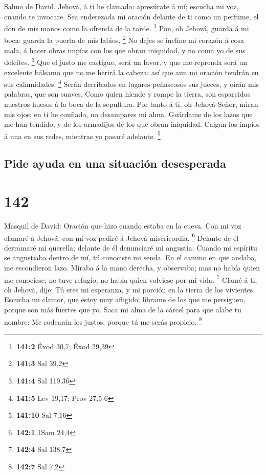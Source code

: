  Salmo de David. Jehová, á ti he clamado: apresúrate á mí;
escucha mi voz, cuando te invocare.  Sea enderezada mi
oración delante de ti como un perfume, el don de mis manos como la
ofrenda de la tarde. \footnote{\textbf{141:2} Éxod 30,7; Éxod 29,39}
 Pon, oh Jehová, guarda á mi boca: guarda la puerta de mis
labios. \footnote{\textbf{141:3} Sal 39,2}  No dejes se
incline mi corazón á cosa mala, á hacer obras impías con los que obran
iniquidad, y no coma yo de sus deleites. \footnote{\textbf{141:4} Sal
  119,36}  Que el justo me castigue, será un favor, y que me
reprenda será un excelente bálsamo que no me herirá la cabeza: así que
aun mi oración tendrán en sus calamidades. \footnote{\textbf{141:5} Lev
  19,17; Prov 27,5-6}  Serán derribados en lugares
peñascosos sus jueces, y oirán mis palabras, que son suaves.
 Como quien hiende y rompe la tierra, son esparcidos
nuestros huesos á la boca de la sepultura.  Por tanto á ti,
oh Jehová Señor, miran mis ojos: en ti he confiado, no desampares mi
alma.  Guárdame de los lazos que me han tendido, y de los
armadijos de los que obran iniquidad.  Caigan los impíos á
una en sus redes, mientras yo pasaré adelante. \footnote{\textbf{141:10}
  Sal 7,16}

\hypertarget{pide-ayuda-en-una-situaciuxf3n-desesperada}{%
\subsection{Pide ayuda en una situación
desesperada}\label{pide-ayuda-en-una-situaciuxf3n-desesperada}}

\hypertarget{section-141}{%
\section{142}\label{section-141}}

 Masquil de David: Oración que hizo cuando estaba en la
cueva. Con mi voz clamaré á Jehová, con mi voz pediré á Jehová
misericordia. \footnote{\textbf{142:1} 1Sam 24,4}  Delante
de él derramaré mi querella; delante de él denunciaré mi angustia.
 Cuando mi espíritu se angustiaba dentro de mí, tú conociste
mi senda. En el camino en que andaba, me escondieron lazo. 
Miraba á la mano derecha, y observaba; mas no había quien me conociese;
no tuve refugio, no había quien volviese por mi vida. \footnote{\textbf{142:4}
  Sal 138,7}  Clamé á ti, oh Jehová, dije: Tú eres mi
esperanza, y mi porción en la tierra de los vivientes. 
Escucha mi clamor, que estoy muy afligido; líbrame de los que me
persiguen, porque son más fuertes que yo.  Saca mi alma de
la cárcel para que alabe tu nombre: Me rodearán los justos, porque tú me
serás propicio. \footnote{\textbf{142:7} Sal 7,2}

